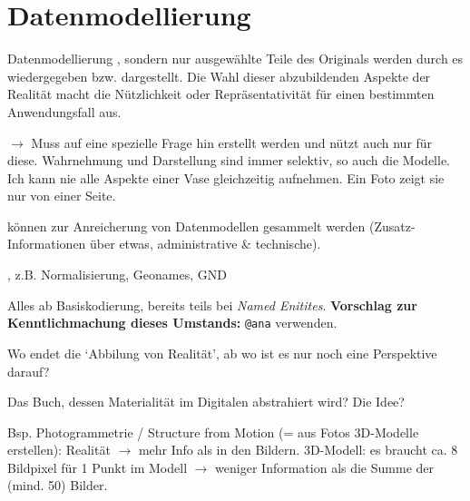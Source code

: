 \section{Datenmodellierung}
\begin{frame}[allowframebreaks]{Datenmodellierung}
, sondern nur ausgewählte Teile des Originals werden durch es wiedergegeben bzw. dargestellt. Die Wahl dieser abzubildenden Aspekte der Realität macht die Nützlichkeit oder Repräsentativität für einen bestimmten Anwendungsfall aus.

 $\to$ Muss auf eine spezielle Frage hin erstellt werden und nützt auch nur für diese. Wahrnehmung und Darstellung sind immer selektiv, so auch die Modelle. Ich kann nie alle Aspekte einer Vase gleichzeitig aufnehmen. Ein Foto zeigt sie nur von einer Seite.

 können zur Anreicherung von Datenmodellen gesammelt werden (Zusatz-Informationen über etwas, administrative \& technische).

, z.B. Normalisierung, Geonames, GND

 Alles ab Basiskodierung, bereits teils bei \emph{Named Enitites}. \textbf{Vorschlag zur Kenntlichmachung dieses Umstands:} \texttt{@ana} verwenden.

Wo endet die `Abbilung von Realität', ab wo ist es nur noch eine Perspektive darauf? 


 Das Buch, dessen Materialität im Digitalen abstrahiert wird? Die Idee?



Bsp. Photogrammetrie / Structure from Motion (= aus Fotos 3D-Modelle erstellen): Realität $\to$ mehr Info als in den Bildern. 3D-Modell: es braucht ca. 8 Bildpixel für 1 Punkt im Modell $\to$ weniger Information als die Summe der (mind. 50) Bilder.
\end{frame}

